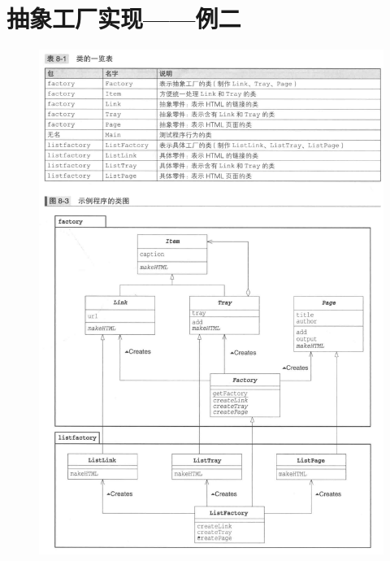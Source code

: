 \section{抽象工厂实现——例二}
\begin{figure}[!h]
	\centering
	\includegraphics[width=\textwidth]{image/8-1}
\end{figure}
